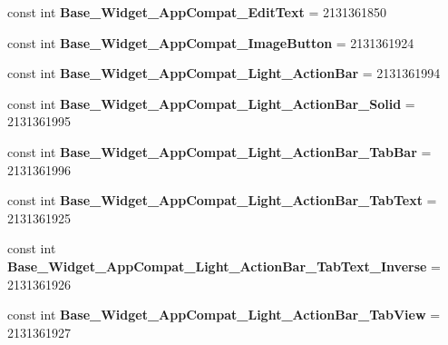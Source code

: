 \begin{DoxyCompactItemize}
\item 
\mbox{\label{classXaria_1_1Resource_1_1Style_ae75e23af3a42e08ac0127d4986731755}} 
const int {\bfseries Base\+\_\+\+Widget\+\_\+\+App\+Compat\+\_\+\+Edit\+Text} = 2131361850
\item 
\mbox{\label{classXaria_1_1Resource_1_1Style_ac719ca7b094735ee303b9b274a81a92b}} 
const int {\bfseries Base\+\_\+\+Widget\+\_\+\+App\+Compat\+\_\+\+Image\+Button} = 2131361924
\item 
\mbox{\label{classXaria_1_1Resource_1_1Style_a5b69cc1ba8e14f6f6883def8c357fa95}} 
const int {\bfseries Base\+\_\+\+Widget\+\_\+\+App\+Compat\+\_\+\+Light\+\_\+\+Action\+Bar} = 2131361994
\item 
\mbox{\label{classXaria_1_1Resource_1_1Style_a952f25e28a8e524ba5816c10f79e9fa9}} 
const int {\bfseries Base\+\_\+\+Widget\+\_\+\+App\+Compat\+\_\+\+Light\+\_\+\+Action\+Bar\+\_\+\+Solid} = 2131361995
\item 
\mbox{\label{classXaria_1_1Resource_1_1Style_aec22fde046fa0b881997893cc0d1321c}} 
const int {\bfseries Base\+\_\+\+Widget\+\_\+\+App\+Compat\+\_\+\+Light\+\_\+\+Action\+Bar\+\_\+\+Tab\+Bar} = 2131361996
\item 
\mbox{\label{classXaria_1_1Resource_1_1Style_a92987154076b710a904588502bab3a6f}} 
const int {\bfseries Base\+\_\+\+Widget\+\_\+\+App\+Compat\+\_\+\+Light\+\_\+\+Action\+Bar\+\_\+\+Tab\+Text} = 2131361925
\item 
\mbox{\label{classXaria_1_1Resource_1_1Style_a22cafc1d4c60367add184fb31050ea40}} 
const int {\bfseries Base\+\_\+\+Widget\+\_\+\+App\+Compat\+\_\+\+Light\+\_\+\+Action\+Bar\+\_\+\+Tab\+Text\+\_\+\+Inverse} = 2131361926
\item 
\mbox{\label{classXaria_1_1Resource_1_1Style_a1c56a46fafa35e2d804d06a1770c3ece}} 
const int {\bfseries Base\+\_\+\+Widget\+\_\+\+App\+Compat\+\_\+\+Light\+\_\+\+Action\+Bar\+\_\+\+Tab\+View} = 2131361927
\item 

\end{DoxyCompactItemize}
